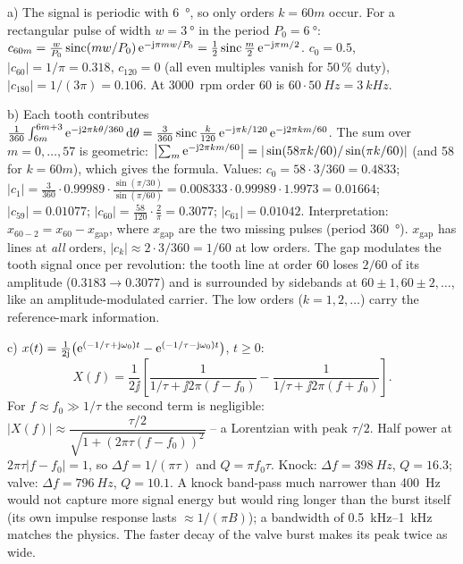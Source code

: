 \begin{solution}
a) The signal is periodic with \SI{6}{\degree}, so only orders $k=60m$ occur.
For a rectangular pulse of width $w=\SI{3}{\degree}$ in the period
$P_0=\SI{6}{\degree}$:
$c_{60m}=\frac{w}{P_0}\operatorname{sinc}(m w/P_0)\,\mathrm{e}^{-\mathrm{j}\pi mw/P_0}
=\frac12\operatorname{sinc}\frac m2\,\mathrm{e}^{-\mathrm{j}\pi m/2}$.
$c_0=0.5$, $|c_{60}|=1/\pi=0.318$, $c_{120}=0$ (all even multiples vanish
for 50\,\% duty), $|c_{180}|=1/(3\pi)=0.106$. At \SI{3000}{rpm} order 60 is
$60\cdot\SI{50}{Hz}=\SI{3}{kHz}$.

b) Each tooth contributes
$\frac1{360}\int_{6m}^{6m+3}\mathrm{e}^{-\mathrm{j}2\pi k\theta/360}\,\mathrm{d}\theta
=\frac{3}{360}\operatorname{sinc}\frac{k}{120}\,\mathrm{e}^{-\mathrm{j}\pi k/120}\,\mathrm{e}^{-\mathrm{j}2\pi km/60}$.
The sum over $m=0,\dots,57$ is geometric:
$\bigl|\sum_m\mathrm{e}^{-\mathrm{j}2\pi km/60}\bigr|=|\sin(58\pi k/60)/\sin(\pi k/60)|$
(and 58 for $k=60m$), which gives the formula. Values:
$c_0=58\cdot3/360=0.4833$;
$|c_1|=\frac{3}{360}\cdot0.99989\cdot\frac{\sin(\pi/30)}{\sin(\pi/60)}=0.008333\cdot0.99989\cdot1.9973=0.01664$;
$|c_{59}|=0.01077$; $|c_{60}|=\frac{58}{120}\cdot\frac2\pi=0.3077$;
$|c_{61}|=0.01042$.
Interpretation: $x_{60-2}=x_{60}-x_\mathrm{gap}$, where $x_\mathrm{gap}$ are the
two missing pulses (period \SI{360}{\degree}). $x_\mathrm{gap}$ has lines at
\emph{all} orders, $|c_k|\approx2\cdot3/360=1/60$ at low orders. The gap
modulates the tooth signal once per revolution: the tooth line at order 60
loses $2/60$ of its amplitude ($0.3183\to0.3077$) and is surrounded by
sidebands at $60\pm1,60\pm2,\dots$, like an amplitude-modulated carrier. The
low orders ($k=1,2,\dots$) carry the reference-mark information.

c) $x(t)=\frac{1}{2\mathrm{j}}\bigl(\mathrm{e}^{(-1/\tau+\mathrm{j}\omega_0)t}-\mathrm{e}^{(-1/\tau-\mathrm{j}\omega_0)t}\bigr)$, $t\ge0$:
\[
X(f)=\frac{1}{2\jj}\left[\frac{1}{1/\tau+\jj2\pi(f-f_0)}-\frac{1}{1/\tau+\jj2\pi(f+f_0)}\right].
\]
For $f\approx f_0\gg1/\tau$ the second term is negligible:
$|X(f)|\approx\dfrac{\tau/2}{\sqrt{1+(2\pi\tau(f-f_0))^2}}$ -- a Lorentzian
with peak $\tau/2$. Half power at $2\pi\tau|f-f_0|=1$, so
$\Delta f=1/(\pi\tau)$ and $Q=\pi f_0\tau$.
Knock: $\Delta f=\SI{398}{Hz}$, $Q=16.3$; valve: $\Delta f=\SI{796}{Hz}$,
$Q=10.1$. A knock band-pass much narrower than \SI{400}{Hz} would not capture
more signal energy but would ring longer than the burst itself (its own
impulse response lasts $\approx1/(\pi B)$); a bandwidth of
\SIrange{0.5}{1}{kHz} matches the physics. The faster decay of the valve burst
makes its peak twice as wide.


\end{solution}

